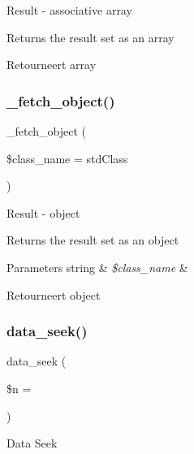 Result -\/ associative array

Returns the result set as an array

\begin{DoxyReturn}{Retourneert}
array 
\end{DoxyReturn}
\mbox{\label{class_c_i___d_b__mysql__result_a60806be6a9c2488820813c2a7f4fef71}} 
\subsubsection{\texorpdfstring{\_fetch\_object()}{\_fetch\_object()}}
{\footnotesize\ttfamily \+\_\+fetch\+\_\+object (\begin{DoxyParamCaption}\item[{}]{\$class\+\_\+name = {\ttfamily \textquotesingle{}stdClass\textquotesingle{}} }\end{DoxyParamCaption})\hspace{0.3cm}{\ttfamily [protected]}}

Result -\/ object

Returns the result set as an object


\begin{DoxyParams}[1]{Parameters}
string & {\em \$class\+\_\+name} & \\
\hline
\end{DoxyParams}
\begin{DoxyReturn}{Retourneert}
object 
\end{DoxyReturn}
\mbox{\label{class_c_i___d_b__mysql__result_a8255ae91816e4206e29eb7581c5af0f1}} 
\subsubsection{\texorpdfstring{data\_seek()}{data\_seek()}}
{\footnotesize\ttfamily data\+\_\+seek (\begin{DoxyParamCaption}\item[{}]{\$n = {} }\end{DoxyParamCaption})}

Data Seek

